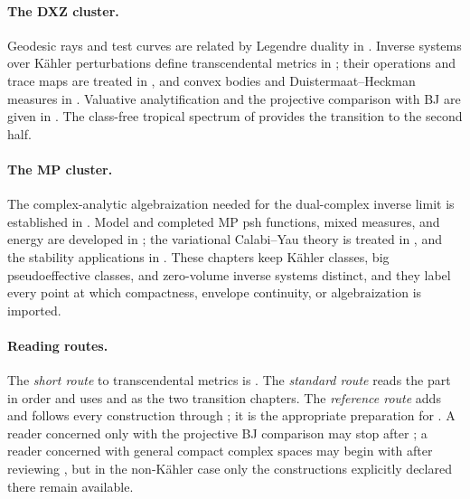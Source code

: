 \paragraph{The DXZ cluster.}
\label{front:part5-the-dxz-cluster}
Geodesic rays and test curves are related by Legendre duality in
.  Inverse systems over K\"ahler perturbations
define transcendental metrics in ; their
operations and trace maps are treated in , and
convex bodies and Duistermaat--Heckman measures in
.  Valuative analytification and the
projective comparison with BJ are given in
.  The
class-free tropical spectrum of 
provides the transition to the second half.

\paragraph{The MP cluster.}
\label{front:part5-the-mp-cluster}
The complex-analytic algebraization needed for the dual-complex inverse limit
is established in .  Model and completed MP psh
functions, mixed measures, and energy are developed in ;
the variational Calabi--Yau theory is treated in , and the
stability applications in .  These chapters keep
K\"ahler classes, big pseudoeffective classes, and zero-volume inverse systems
distinct, and they label every point at which compactness, envelope
continuity, or algebraization is imported.

\paragraph{Reading routes.}
\label{front:part5-reading-routes}
The \emph{short route} to transcendental metrics is
.
The \emph{standard route} reads the part in order and uses
 and  as the
two transition chapters.  The \emph{reference route} adds
and follows every construction through ; it is
the appropriate preparation for
.  A reader concerned only with the
projective BJ comparison may stop after ; a
reader concerned with general compact complex spaces may begin with
 after reviewing
, but in the non-K\"ahler case only the
constructions explicitly declared there remain available.

